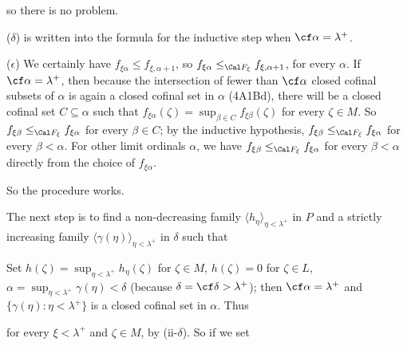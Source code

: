 {

\noindent so there is no problem.

($\delta$) is written into the formula for the inductive step when
$\cf\alpha=\lambda^+$.

($\epsilon$) We certainly have $f_{\xi\alpha}\le f_{\xi,\alpha+1}$, so
$f_{\xi\alpha}\le_{\Cal F_{\xi}}f_{\xi,\alpha+1}$, for
every $\alpha$.   If $\cf\alpha=\lambda^+$, then
because the intersection of
fewer than $\cf\alpha$ closed cofinal subsets of $\alpha$ is again a
closed cofinal set in $\alpha$ (4A1Bd), there
will be a closed cofinal set $C\subseteq\alpha$ such that
$f_{\xi\alpha}(\zeta)=\sup_{\beta\in C}f_{\xi\beta}(\zeta)$ for every
$\zeta\in M$.   So $f_{\xi\beta}\le_{\Cal F_{\xi}}f_{\xi\alpha}$ for every
$\beta\in C$;  by the inductive hypothesis,
$f_{\xi\beta}\le_{\Cal F_{\xi}}f_{\xi\alpha}$ for every
$\beta<\alpha$.   For other limit ordinals $\alpha$, we have
$f_{\xi\beta}\le_{\Cal F_{\xi}}f_{\xi\alpha}$ for every
$\beta<\alpha$ directly from the choice of $f_{\xi\alpha}$.

So the procedure works.\ \Qed

\medskip

 The next step is to find a non-decreasing family
$\langle h_{\eta}\rangle_{\eta<\lambda^+}$ in $P$ and a strictly
increasing family
$\langle\gamma(\eta)\rangle_{\eta<\lambda^+}$ in $\delta$ such that


\noindent Set $h(\zeta)=\sup_{\eta<\lambda^+}h_{\eta}(\zeta)$
for $\zeta\in M$, $h(\zeta)=0$ for $\zeta\in L$,
$\alpha=\sup_{\eta<\lambda^+}\gamma(\eta)<\delta$ (because
$\delta=\cf\delta>\lambda^+$);  then $\cf\alpha=\lambda^+$ and
$\{\gamma(\eta):\eta<\lambda^+\}$ is a closed cofinal set in
$\alpha$.   Thus


\noindent for every $\xi<\lambda^+$ and $\zeta\in M$, by (ii-$\delta$).
So if we set

}
